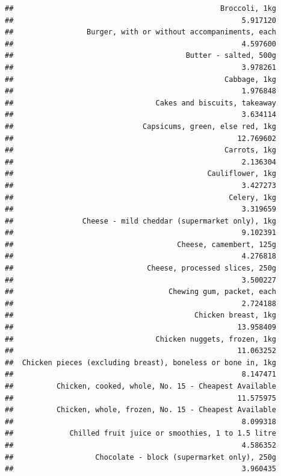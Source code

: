 \documentclass[
  landscape]{article}
\begin{document}
\begin{verbatim}
##                                                Broccoli, 1kg 
##                                                     5.917120 
##                 Burger, with or without accompaniments, each 
##                                                     4.597600 
##                                        Butter - salted, 500g 
##                                                     3.978261 
##                                                 Cabbage, 1kg 
##                                                     1.976848 
##                                 Cakes and biscuits, takeaway 
##                                                     3.634114 
##                              Capsicums, green, else red, 1kg 
##                                                    12.769602 
##                                                 Carrots, 1kg 
##                                                     2.136304 
##                                             Cauliflower, 1kg 
##                                                     3.427273 
##                                                  Celery, 1kg 
##                                                     3.319659 
##                Cheese - mild cheddar (supermarket only), 1kg 
##                                                     9.102391 
##                                      Cheese, camembert, 125g 
##                                                     4.276818 
##                               Cheese, processed slices, 250g 
##                                                     3.500227 
##                                    Chewing gum, packet, each 
##                                                     2.724188 
##                                          Chicken breast, 1kg 
##                                                    13.958409 
##                                 Chicken nuggets, frozen, 1kg 
##                                                    11.063252 
##  Chicken pieces (excluding breast), boneless or bone in, 1kg 
##                                                     8.147471 
##          Chicken, cooked, whole, No. 15 - Cheapest Available 
##                                                    11.575975 
##          Chicken, whole, frozen, No. 15 - Cheapest Available 
##                                                     8.099318 
##             Chilled fruit juice or smoothies, 1 to 1.5 litre 
##                                                     4.586352 
##                   Chocolate - block (supermarket only), 250g 
##                                                     3.960435 

\end{verbatim}
\end{document}
